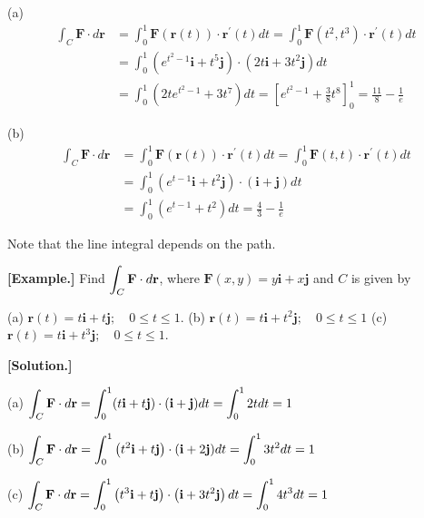 \documentclass[11pt, a4paper]{MATH2023}
\newcommand{\eg}{\textbf{[Example.] }}
\newcommand{\sol}{\textbf{[Solution.] }}
\begin{document}
\begin{spacing}{1.3}
    (a)
    $$\begin{aligned}
    \int_{C} \mathbf{F} \cdot d \mathbf{r} &=\int_{0}^{1} \mathbf{F}(\mathbf{r}(t)) \cdot \mathbf{r}^{\prime}(t) d t=\int_{0}^{1} \mathbf{F}\left(t^{2}, t^{3}\right) \cdot \mathbf{r}^{\prime}(t) d t \\
    &=\int_{0}^{1}\left(e^{t^{2}-1} \mathbf{i}+t^{5} \mathbf{j}\right) \cdot\left(2 t \mathbf{i}+3 t^{2} \mathbf{j}\right) d t \\
    &=\int_{0}^{1}\left(2 t e^{t^{2}-1}+3 t^{7}\right) d t =\left[e^{t^{2}-1}+\frac{3}{8} t^{8}\right]_{0}^{1}=\frac{11}{8}-\frac{1}{e}
    \end{aligned}$$

    (b)
    $$\begin{aligned}
    \int_{C} \mathbf{F} \cdot d \mathbf{r} &=\int_{0}^{1} \mathbf{F}(\mathbf{r}(t)) \cdot \mathbf{r}^{\prime}(t) d t=\int_{0}^{1} \mathbf{F}(t, t) \cdot \mathbf{r}^{\prime}(t) d t \\
    &=\int_{0}^{1}\left(e^{t-1} \mathbf{i}+t^{2} \mathbf{j}\right) \cdot(\mathbf{i}+\mathbf{j}) d t \\
    &=\int_{0}^{1}\left(e^{t-1}+t^{2}\right) d t =\frac{4}{3}-\frac{1}{e}
    \end{aligned}$$

    {\blue Note that the line integral depends on the path.}
    
    \vspace{0.2in}
    \eg Find $\displaystyle \int_{C} \mathbf{F} \cdot d \mathbf{r}$, where $\mathbf{F}(x, y)=y \mathbf{i}+x \mathbf{j}$ and $C$ is given by
    
    (a) $\mathbf{r}(t)=t \mathbf{i}+t \mathbf{j} ; \quad 0 \leqslant t \leqslant 1$.\hspace{0.2in}
    (b) $\mathbf{r}(t)=t \mathbf{i}+t^{2} \mathbf{j} ; \quad 0 \leqslant t \leqslant 1$\hspace{0.2in}
    (c) $\mathbf{r}(t)=t \mathbf{i}+t^{3} \mathbf{j} ; \quad 0 \leqslant t \leqslant 1$.

    \sol

    (a) $\displaystyle \int_{C} \mathbf{F} \cdot d \mathbf{r}=\int_{0}^{1}(t \mathbf{i}+t \mathbf{j}) \cdot(\mathbf{i}+\mathbf{j}) d t=\int_{0}^{1} 2 t d t=1$
    
    (b) $\displaystyle \int_{C} \mathbf{F} \cdot d \mathbf{r}=\int_{0}^{1}\left(t^{2} \mathbf{i}+t \mathbf{j}\right) \cdot(\mathbf{i}+2 \mathbf{j}) d t=\int_{0}^{1} 3 t^{2} d t=1$
    
    (c) $\displaystyle \int_{C} \mathbf{F} \cdot d \mathbf{r}=\int_{0}^{1}\left(t^{3} \mathbf{i}+t \mathbf{j}\right) \cdot\left(\mathbf{i}+3 t^{2} \mathbf{j}\right) d t=\int_{0}^{1} 4 t^{3} d t=1$


\end{spacing}
\end{document}
